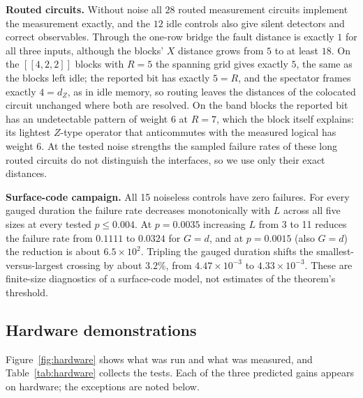 \documentclass[10pt,a4paper,twocolumn]{article}
\begin{document}
\textbf{Routed circuits.}  Without noise all $28$ routed measurement circuits
implement the measurement exactly, and the $12$ idle controls also give silent
detectors and correct observables.  Through the one-row bridge the fault
distance is exactly $1$ for all three inputs, although the blocks' $X$ distance
grows from $5$ to at least $18$.  On the $[[4,2,2]]$ blocks with $R=5$ the
spanning grid gives exactly $5$, the same as the blocks left idle; the reported
bit has exactly $5=R$, and the spectator frames exactly $4=d_Z$, as in idle
memory, so routing leaves the distances of the colocated circuit unchanged where
both are resolved.  On the band blocks the reported bit has an undetectable
pattern of weight $6$ at $R=7$, which the block itself explains: its lightest
$Z$-type operator that anticommutes with the measured logical has weight $6$.  At
the tested noise strengths the sampled failure rates of these long routed
circuits do not distinguish the interfaces, so we use only their exact
distances.

\textbf{Surface-code campaign.}  All 15 noiseless controls have zero failures.
For every gauged duration the failure rate decreases monotonically with $L$
across all five sizes at every tested $p\le0.004$.  At $p=0.0035$ increasing $L$
from 3 to 11 reduces the failure rate from $0.1111$ to $0.0324$ for $G=d$, and
at $p=0.0015$ (also $G=d$) the reduction is about $6.5\times10^2$.  Tripling the gauged
duration shifts the smallest-versus-largest crossing by about $3.2\%$, from
$4.47\times10^{-3}$ to $4.33\times10^{-3}$.  These are finite-size diagnostics of
a surface-code model, not estimates of the theorem's threshold.

\subsection{Hardware demonstrations}
\label{sec:hw-results}
Figure~\ref{fig:hardware} shows what was run and what was measured, and
Table~\ref{tab:hardware} collects the tests.  Each of the three predicted gains
appears on hardware; the exceptions are noted below.
\end{document}
